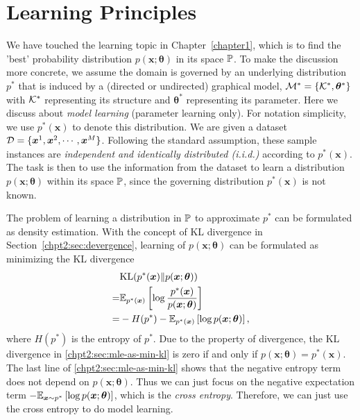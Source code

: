 \section{Learning Principles}
\label{chpt2:sec:learning-principles}
We have touched the learning topic in Chapter~\ref{chapter1}, which is to find the 'best' probability distribution $p(\bm{x}; \bm{\theta})$ in its space $\mathbb{P}$. To make the discussion more concrete, we assume the domain is governed by an underlying distribution $p^{\ast}$ that is induced by a (directed or undirected) graphical model, $\mathcal{M}^{\ast} = \left\{ \mathcal{K}^{\ast}, \bm{\theta}^{\ast} \right\}$ with $\mathcal{K}^{\ast}$ representing its structure and $\bm{\theta}^{\ast}$ representing its parameter. Here we discuss about \textit{model learning} (parameter learning only). For notation simplicity, we use $p^{\ast}(\bm{x})$ to denote this distribution. We are given a dataset $\mathcal{D} = \{\bm{x}^{1}, \bm{x}^{2}, \cdots, \bm{x}^{M}\}$. Following the standard assumption, these sample instances are \textit{independent and identically distributed (i.i.d.)} according to $p^{\ast}(\bm{x})$. The task is then to use the information from the dataset to learn a distribution $p(\bm{x};\bm{\theta})$ within its space $\mathbb{P}$, since the governing distribution $p^{\ast}(\bm{x})$ is not known.

The problem of learning a distribution in $\mathbb{P}$ to approximate $p^{\ast}$ can be formulated as density estimation. With the concept of KL divergence in Section~\ref{chpt2:sec:devergence}, learning of $p(\bm{x};\bm{\theta})$ can be formulated as minimizing the KL divergence
\begin{align}\label{chpt2:sec:mle-as-min-kl}
  &\mathrm{KL}(p^{\ast}(\bm{x})\|p(\bm{x}; \bm{\theta})) \nonumber \\
  =& \mathbb{E}_{p^{\ast}(\bm{x})}\left[ \log{\frac{p^{\ast}(\bm{x})}{p(\bm{x}; \bm{\theta})}} \right] \nonumber \\
  =& - H(p^{\ast}) - \mathbb{E}_{p^{\ast}(\bm{x})}\left[ \log{{p(\bm{x}; \bm{\theta})}} \right],
\end{align}
where $H(p^{\ast})$ is the entropy of $p^{\ast}$.
Due to the property of divergence, the KL divergence in \eqref{chpt2:sec:mle-as-min-kl} is zero if and only if $p(\bm{x};\bm{\theta})=p^{\ast}(\bm{x})$. The last line of \eqref{chpt2:sec:mle-as-min-kl} shows that the negative entropy term does not depend on $p(\bm{x}; \bm{\theta})$. Thus we can just focus on the negative expectation term $-\mathbb{E}_{\bm{x} \sim p^{\ast}}\left[ \log{{p(\bm{x}; \bm{\theta})}} \right]$, which is the \textit{cross entropy}. Therefore, we can just use the cross entropy to do model learning.

